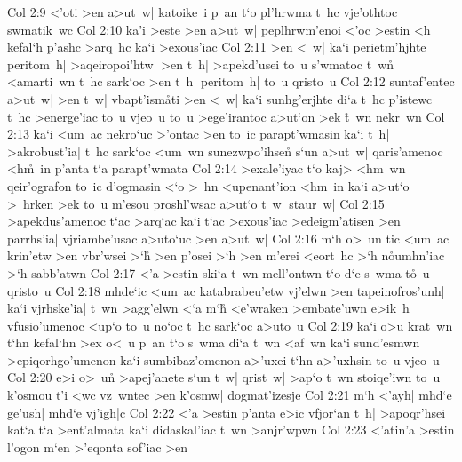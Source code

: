 \vs Col 2:9
<'oti
>en
a>ut~w|
katoike~i
p~an
t`o
pl'hrwma
t~hc
vje'othtoc
swmatik~wc\bibvsend
\vs Col 2:10
ka'i
>este
>en
a>ut~w|
peplhrwm'enoi
<'oc
>estin
<h
kefal`h
p'ashc
>arq~hc
ka`i
>exous'iac\bibvsend
\vs Col 2:11
>en
<~w|
ka`i
perietm'hjhte
peritom~h|
>aqeiropoi'htw|
>en
t~h|
>apekd'usei
to~u
s'wmatoc
t~wn\r{}
<amarti~wn
t~hc
sark`oc
>en
t~h|
peritom~h|
to~u
qristo~u\bibvsend
\vs Col 2:12
suntaf'entec
a>ut~w|
>en
t~w|
vbapt'ism\r{a}ti
>en
<~w|
ka`i
sunhg'erjhte
di`a
t~hc
p'istewc
t~hc
>energe'iac
to~u
vjeo~u
to~u
>ege'irantoc
a>ut`on
>ek
\r{t}~wn
nekr~wn\bibvsend
\vs Col 2:13
ka`i
<um~ac
nekro`uc
>'ontac
>en
to~ic
parapt'wmasin
ka`i
t~h|
>akrobust'ia|
t~hc
sark`oc
<um~wn
sunezwpo'ihsen\r{}
s`un
a>ut~w|
qaris'amenoc
<h\r{m}~in
p'anta
t`a
parapt'wmata\bibvsend
\vs Col 2:14
>exale'iyac
t`o
kaj>
<hm~wn
qeir'ografon
to~ic
d'ogmasin
<`o
>~hn
<upenant'ion
<hm~in
ka`i
a>ut`o
>~hrken
>ek
to~u
m'esou
proshl'wsac
a>ut`o
t~w|
staur~w|\bibvsend
\vs Col 2:15
>apekdus'amenoc
t`ac
>arq`ac
ka`i
t`ac
>exous'iac
>edeigm'atisen
>en
parrhs'ia|
vjriambe'usac
a>uto`uc
>en
a>ut~w|\bibvsend
\vs Col 2:16
m`h
o>~un
tic
<um~ac
krin'etw
>en
vbr'wsei
>`h\r{}
>en
p'osei
>`h
>en
m'erei
<eort~hc
>`h
n\r{o}umhn'iac
>`h
sabb'atwn\bibvsend
\vs Col 2:17
<'a
>estin
ski`a
t~wn
mell'ontwn
t`o
d`e
s~wma
t\r{o}~u
qristo~u\bibvsend
\vs Col 2:18
mhde`ic
<um~ac
katabrabeu'etw
vj'elwn
>en
tapeinofros'unh|
ka`i
vjrhske'ia|
t~wn
>agg'elwn
<`a
m`h\r{}
<e'wraken
>embate'uwn
e>ik~h
vfusio'umenoc
<up`o
to~u
no`oc
t~hc
sark`oc
a>uto~u\bibvsend
\vs Col 2:19
ka`i
o>u
krat~wn
t`hn
kefal`hn
>ex
o<~u
p~an
t`o
s~wma
di`a
t~wn
<af~wn
ka`i
sund'esmwn
>epiqorhgo'umenon
ka`i
sumbibaz'omenon
a>'uxei
t`hn
a>'uxhsin
to~u
vjeo~u\bibvsend
\vs Col 2:20
e>i
o>~un\r{}
>apej'anete
s`un
t~w|
qrist~w|
>ap`o
t~wn
stoiqe'iwn
to~u
k'osmou
t'i
<wc
vz~wntec
>en
k'osmw|
dogmat'izesje\bibvsend
\vs Col 2:21
m`h
<'ayh|
mhd`e
ge'ush|
mhd`e
vj'igh|c\bibvsend
\vs Col 2:22
<'a
>estin
p'anta
e>ic
vfjor`an
t~h|
>apoqr'hsei
kat`a
t`a
>ent'almata
ka`i
didaskal'iac
t~wn
>anjr'wpwn\bibvsend
\vs Col 2:23
<'atin'a
>estin
l'ogon
m`en
>'eqonta
sof'iac
>en
